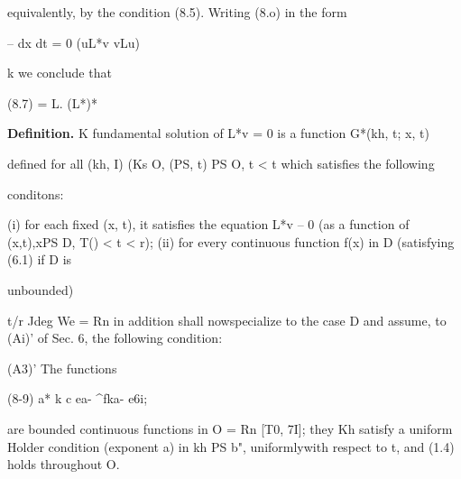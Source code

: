 \begin{ocrformula}
equivalently,        by the condition        (8.5). Writing         (8.o) in the form
\end{ocrformula}

\begin{ocrformula}
--           dx dt = 0
(uL*v            vLu)
\end{ocrformula}

k we conclude that

\begin{ocrformula}
(8.7)                                                    =   L.
(L*)*
\end{ocrformula}

\medskip\noindent\textbf{Definition.} K fundamental solution of L*v = 0 is a function G*(kh, t; x, t)

\begin{ocrformula}
defined   for all (kh, I) (Ks O, (PS, t) PS O, t < t which                        satisfies the following
\end{ocrformula}

conditons:

\begin{ocrformula}
(i) for each fixed (x, t), it satisfies the equation                               L*v    -- 0 (as a function
of (x,t),xPS   D, T() < t < r);
(ii) for every            continuous            function        f(x) in D          (satisfying            (6.1) if D        is
\end{ocrformula}

unbounded)

\begin{ocrformula}
(8.8)                                lim f T*{z, t; x, r)/(PS) ax = f(x).
\end{ocrformula}

t/r Jdeg We = Rn in addition shall nowspecialize to the case D and assume, to (Ai)' of Sec. 6, the following condition:

(A3)' The functions

\begin{ocrformula}
(8-9)                        a*                                             k                         c
ea-             ^fka-                       e6i;
\end{ocrformula}

are bounded continuous functions in O = Rn [T0, 7I]; they Kh satisfy a uniform Holder condition (exponent a) in kh PS b", uniformlywith respect to t, and (1.4) holds throughout O.

